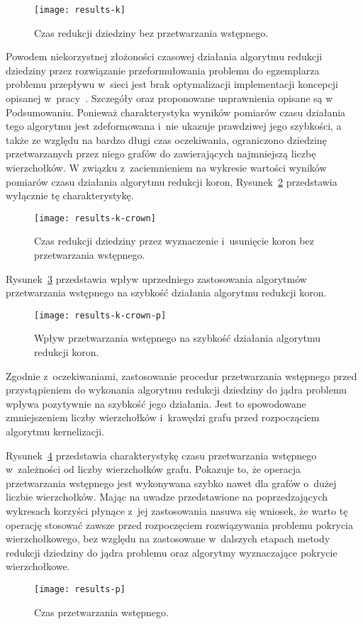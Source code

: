   \begin{figure}
    \centering
      \texttt{[image: results-k]}
      \caption{Czas redukcji dziedziny bez przetwarzania wstępnego.}
    \label{fig_results_k}
  \end{figure}

  Powodem niekorzystnej złożoności czasowej działania algorytmu redukcji dziedziny przez rozwiązanie przeformułowania problemu do egzemplarza problemu przepływu w~sieci jest brak optymalizacji implementacji koncepcji opisanej w~pracy~\cite{KernelizationAlgorithms04}.
  Szczegóły oraz proponowane usprawnienia opisane są w Podsumowaniu.
  Ponieważ charakterystyka wyników pomiarów czasu działania tego algorytmu jest zdeformowana i~nie ukazuje prawdziwej jego szybkości, a także ze względu na bardzo długi czas oczekiwania, ograniczono dziedzinę przetwarzanych przez niego grafów do zawierających najmniejszą liczbę wierzchołków.
  W związku z~zaciemnieniem na wykresie wartości wyników pomiarów czasu działania algorytmu redukcji koron, Rysunek~\ref{fig_results_k_crown} przedstawia wyłącznie tę charakterystykę.

  \begin{figure}
    \centering
      \texttt{[image: results-k-crown]}
    \caption{Czas redukcji dziedziny przez wyznaczenie i~usunięcie koron bez przetwarzania wstępnego.}
    \label{fig_results_k_crown}
  \end{figure}

  Rysunek~\ref{fig_results_k_crown_p} przedstawia wpływ uprzedniego zastosowania algorytmów przetwarzania wstępnego na szybkość działania algorytmu redukcji koron.
  \begin{figure}
    \centering
      \texttt{[image: results-k-crown-p]}
    \caption{Wpływ przetwarzania wstępnego na szybkość działania algorytmu redukcji koron.}
    \label{fig_results_k_crown_p}
  \end{figure}

  Zgodnie z~oczekiwaniami, zastosowanie procedur przetwarzania wstępnego przed przystąpieniem do wykonania algorytmu redukcji dziedziny do jądra problemu wpływa pozytywnie na szybkość jego działania.
  Jest to spowodowane zmniejszeniem liczby wierzchołków i~krawędzi grafu przed rozpocząciem algorytmu kernelizacji.

  Rysunek~\ref{fig_results_p} przedstawia charakterystykę czasu przetwarzania wstępnego w~zależności od liczby wierzchołków grafu.
  Pokazuje to, że operacja przetwarzania wstępnego jest wykonywana szybko nawet dla grafów o~dużej liczbie wierzchołków. Mając na uwadze przedstawione na poprzedzających wykresach korzyści płynące z~jej zastosowania nasuwa się wniosek, że warto tę operację stosować zawsze przed rozpoczęciem rozwiązywania problemu pokrycia wierzchołkowego, bez względu na zastosowane w~dalszych etapach metody redukcji dziedziny do jądra problemu oraz algorytmy wyznaczające pokrycie wierzchołkowe.
  \begin{figure}
    \label{fig_results_p}
    \centering
      \texttt{[image: results-p]}
    \caption{Czas przetwarzania wstępnego.}
  \end{figure}
